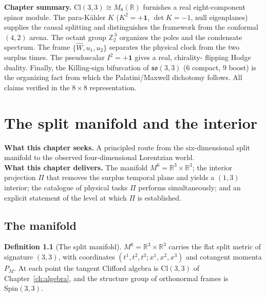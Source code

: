 \documentclass[11pt,oneside]{book}
\newcommand{\Wh}{\hat{W}}                         %
\newcommand{\Cl}{\mathrm{Cl}}                     %
\newcommand{\Zt}{\mathbb{Z}_2}
\newcommand{\RR}{\mathbb{R}}
\newcommand{\so}{\mathfrak{so}}
\newcommand{\Spin}{\mathrm{Spin}}
\theoremstyle{plain}
\theoremstyle{definition}
\newtheorem{definition}[theorem]{Definition}
\theoremstyle{remark}
\begin{document}
\begin{leavesbox}
\textbf{Chapter summary.} $\Cl(3,3)\cong M_8(\RR)$ furnishes a real eight-component
spinor module. The para-K\"ahler $K$ ($K^2=+\mathbf 1$, $\det K=-1$, null
eigenplanes) supplies the causal splitting and distinguishes the framework from the
conformal $(4,2)$ arena. The octant group $\Zt^{\,3}$ organizes the poles and the
condensate spectrum. The frame $\{\Wh,u_1,u_2\}$ separates the physical clock from
the two surplus times. The pseudoscalar $I^2=+\mathbf 1$ gives a real, chirality-
flipping Hodge duality. Finally, the Killing-sign bifurcation of $\so(3,3)$
($6$ compact, $9$ boost) is the organizing fact from which the Palatini/Maxwell
dichotomy follows. All claims verified in the $8\times8$ representation.
\end{leavesbox}

\chapter{The split manifold and the interior}
\label{ch:manifold}

\begin{leavesbox}
\textbf{What this chapter seeks.} A principled route from the six-dimensional split
manifold to the observed four-dimensional Lorentzian world.\\[2pt]
\textbf{What this chapter delivers.} The manifold $M^6=\RR^3\times\RR^3$; the
interior projection $\Pi$ that removes the surplus temporal plane and yields a
$(1,3)$ interior; the catalogue of physical tasks $\Pi$ performs simultaneously;
and an explicit statement of the level at which $\Pi$ is established.
\end{leavesbox}

\section{The manifold}
\label{sec:M6}

\begin{definition}[The split manifold]
\label{def:M6}
$M^6=\RR^3\times\RR^3$ carries the flat split metric of signature $(3,3)$, with
coordinates $(t^1,t^2,t^3;x^1,x^2,x^3)$ and cotangent momenta $P_M$. At each point
the tangent Clifford algebra is $\Cl(3,3)$ of Chapter~\ref{ch:algebra}, and the
structure group of orthonormal frames is $\Spin(3,3)$.
\end{definition}
\end{document}
